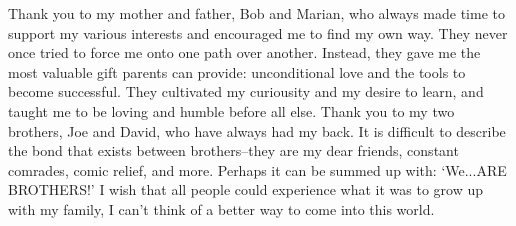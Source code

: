 Thank you to my mother and father, Bob and Marian, who always made time to
support my various interests and encouraged me to find my own way. They never
once tried to force me onto one path over another. Instead, they gave me the
most valuable gift parents can provide: unconditional love and the tools to
become successful. They cultivated my curiousity and my desire to learn, and
taught me to be loving and humble before all else. Thank you to my two
brothers, Joe and David, who have always had my back. It is difficult to
describe the bond that exists between brothers--they are my dear friends,
constant comrades, comic relief, and more. Perhaps it can be summed up with:
`We...ARE BROTHERS!' I wish that all people could experience what it was to
grow up with my family, I can't think of a better way to come into this world. 
